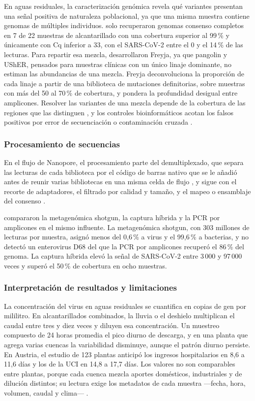 En aguas residuales, la caracterización genómica revela qué variantes presentan una señal positiva de naturaleza poblacional, ya que una misma muestra contiene genomas de múltiples individuos.  solo recuperaron genomas consenso completos en 7 de 22 muestras de alcantarillado con una cobertura superior al 99\,\% y únicamente con Cq inferior a 33, con el SARS-CoV-2 entre el 0 y el 14\,\% de las lecturas. Para repartir esa mezcla,  desarrollaron Freyja, ya que pangolin y UShER, pensados para muestras clínicas con un único linaje dominante, no estiman las abundancias de una mezcla. Freyja deconvoluciona la proporción de cada linaje a partir de una biblioteca de mutaciones definitorias, sobre muestras con más del 50 al 70\,\% de cobertura, y pondera la profundidad desigual entre amplicones. Resolver las variantes de una mezcla depende de la cobertura de las regiones que las distinguen \cite{Child_2023}, y los controles bioinformáticos acotan los falsos positivos por error de secuenciación o contaminación cruzada \cite{Dash_2024}.

\subsubsection{Procesamiento de secuencias}

En el flujo de Nanopore, el procesamiento parte del demultiplexado, que separa las lecturas de cada biblioteca por el código de barras nativo que se le añadió antes de reunir varias bibliotecas en una misma celda de flujo \cite{ONT_2025}, y sigue con el recorte de adaptadores, el filtrado por calidad y tamaño, y el mapeo o ensamblaje del consenso \cite{Dash_2024}.

 compararon la metagenómica shotgun, la captura híbrida y la PCR por amplicones en el mismo influente. La metagenómica shotgun, con 303 millones de lecturas por muestra, asignó menos del 0,6\,\% a virus y el 99,6\,\% a bacterias, y no detectó un enterovirus D68 del que la PCR por amplicones recuperó el 86\,\% del genoma. La captura híbrida elevó la señal de SARS-CoV-2 entre 3\,000 y 97\,000 veces y superó el 50\,\% de cobertura en ocho muestras.

\subsubsection{Interpretación de resultados y limitaciones}

La concentración del virus en aguas residuales se cuantifica en copias de gen por mililitro. En alcantarillados combinados, la lluvia o el deshielo multiplican el caudal entre tres y diez veces y diluyen esa concentración. Un muestreo compuesto de 24 horas promedia el pico diurno de descarga, y en una planta que agrega varias cuencas la variabilidad disminuye, aunque el patrón diurno persiste. En Austria, el estudio de 123 plantas anticipó los ingresos hospitalarios en 8,6 a 11,6 días y los de la UCI en 14,8 a 17,7 días. Los valores no son comparables entre plantas, porque cada cuenca mezcla aportes domésticos, industriales y de dilución distintos; su lectura exige los metadatos de cada muestra —fecha, hora, volumen, caudal y clima— \cite{Parkins_2023}.

